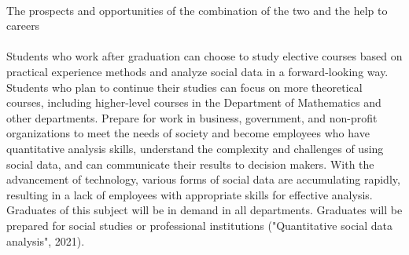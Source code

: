 \documentclass{article}
\begin{document}
	\\
	The prospects and opportunities of the combination of the two and the help to careers \\
	\\
	Students who work after graduation can choose to study elective courses based on practical experience methods and analyze social data in a forward-looking way. Students who plan to continue their studies can focus on more theoretical courses, including higher-level courses in the Department of Mathematics and other departments. Prepare for work in business, government, and non-profit organizations to meet the needs of society and become employees who have quantitative analysis skills, understand the complexity and challenges of using social data, and can communicate their results to decision makers. With the advancement of technology, various forms of social data are accumulating rapidly, resulting in a lack of employees with appropriate skills for effective analysis. Graduates of this subject will be in demand in all departments. Graduates will be prepared for social studies or professional institutions ("Quantitative social data analysis", 2021). 
	
\end{document}
